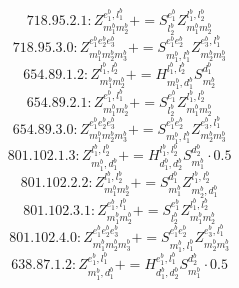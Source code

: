 \documentclass[letterpaper,10pt,fleqn,leqno,onecolumn]{article}
\begin{document}
\begin{equation} \;\;\;\;\;\;  718.95.2.1: Z^{e_{1}^{b},l_{1}^{b}}_{m_{1}^{b}m_{2}^{b}}+=S^{e_{1}^{b}}_{l_{2}^{b}}Z^{l_{1}^{b},l_{2}^{b}}_{m_{1}^{b}m_{2}^{b}} \end{equation}
\begin{equation} \;\;\;\;\;\;  718.95.3.0: Z^{e_{1}^{b}e_{2}^{b}e_{3}^{b}}_{m_{1}^{b}m_{2}^{b}m_{3}^{b}}+=S^{e_{1}^{b}e_{2}^{b}}_{m_{1}^{b},l_{1}^{b}}Z^{e_{3}^{b},l_{1}^{b}}_{m_{2}^{b}m_{3}^{b}} \end{equation}
\begin{equation} \;\;\;\;\;\;  654.89.1.2: Z^{l_{1}^{b},l_{2}^{b}}_{m_{1}^{b}m_{2}^{b}}+=H^{l_{1}^{b},l_{2}^{b}}_{m_{1}^{b},d_{1}^{b}}S^{d_{1}^{b}}_{m_{2}^{b}} \end{equation}
\begin{equation} \;\;\;\;\;\;  654.89.2.1: Z^{e_{1}^{b},l_{1}^{b}}_{m_{1}^{b}m_{2}^{b}}+=S^{e_{1}^{b}}_{l_{2}^{b}}Z^{l_{1}^{b},l_{2}^{b}}_{m_{1}^{b}m_{2}^{b}} \end{equation}
\begin{equation} \;\;\;\;\;\;  654.89.3.0: Z^{e_{1}^{b}e_{2}^{b}e_{3}^{b}}_{m_{1}^{b}m_{2}^{b}m_{3}^{b}}+=S^{e_{1}^{b}e_{2}^{b}}_{m_{1}^{b},l_{1}^{b}}Z^{e_{3}^{b},l_{1}^{b}}_{m_{2}^{b}m_{3}^{b}} \end{equation}
\begin{equation} \;\;\;\;\;\;  801.102.1.3: Z^{l_{1}^{b},l_{2}^{b}}_{m_{1}^{b},d_{1}^{b}}+=H^{l_{1}^{b},l_{2}^{b}}_{d_{1}^{b},d_{2}^{b}}S^{d_{2}^{b}}_{m_{1}^{b}}\cdot 0.5 \end{equation}
\begin{equation} \;\;\;\;\;\;  801.102.2.2: Z^{l_{1}^{b},l_{2}^{b}}_{m_{1}^{b}m_{2}^{b}}+=S^{d_{1}^{b}}_{m_{1}^{b}}Z^{l_{1}^{b},l_{2}^{b}}_{m_{2}^{b},d_{1}^{b}} \end{equation}
\begin{equation} \;\;\;\;\;\;  801.102.3.1: Z^{e_{1}^{b},l_{1}^{b}}_{m_{1}^{b}m_{2}^{b}}+=S^{e_{1}^{b}}_{l_{2}^{b}}Z^{l_{1}^{b},l_{2}^{b}}_{m_{1}^{b}m_{2}^{b}} \end{equation}
\begin{equation} \;\;\;\;\;\;  801.102.4.0: Z^{e_{1}^{b}e_{2}^{b}e_{3}^{b}}_{m_{1}^{b}m_{2}^{b}m_{3}^{b}}+=S^{e_{1}^{b}e_{2}^{b}}_{m_{1}^{b},l_{1}^{b}}Z^{e_{3}^{b},l_{1}^{b}}_{m_{2}^{b}m_{3}^{b}} \end{equation}
\begin{equation} \;\;\;\;\;\;  638.87.1.2: Z^{e_{1}^{b},l_{1}^{b}}_{m_{1}^{b},d_{1}^{b}}+=H^{e_{1}^{b},l_{1}^{b}}_{d_{1}^{b},d_{2}^{b}}S^{d_{2}^{b}}_{m_{1}^{b}}\cdot 0.5 \end{equation}
\end{document}
